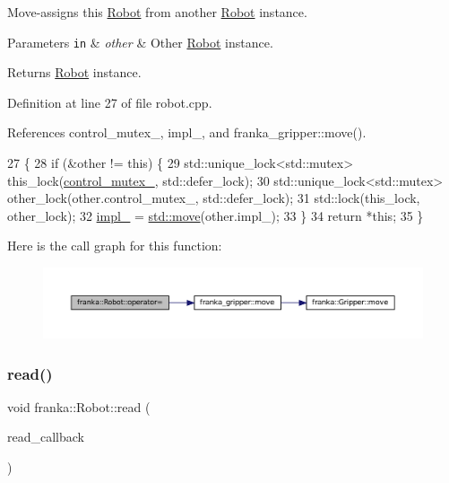 Move-\/assigns this \hyperlink{classfranka_1_1Robot}{Robot} from another \hyperlink{classfranka_1_1Robot}{Robot} instance.


\begin{DoxyParams}[1]{Parameters}
\mbox{\tt in}  & {\em other} & Other \hyperlink{classfranka_1_1Robot}{Robot} instance.\\
\hline
\end{DoxyParams}
\begin{DoxyReturn}{Returns}
\hyperlink{classfranka_1_1Robot}{Robot} instance. 
\end{DoxyReturn}


Definition at line 27 of file robot.\+cpp.



References control\+\_\+mutex\+\_\+, impl\+\_\+, and franka\+\_\+gripper\+::move().


\begin{DoxyCode}
27                                               \{
28   \textcolor{keywordflow}{if} (&other != \textcolor{keyword}{this}) \{
29     std::unique\_lock<std::mutex> this\_lock(\hyperlink{classfranka_1_1Robot_a719ad1fab76f8edfc9f6f761671c1375}{control\_mutex\_}, std::defer\_lock);
30     std::unique\_lock<std::mutex> other\_lock(other.control\_mutex\_, std::defer\_lock);
31     std::lock(this\_lock, other\_lock);
32     \hyperlink{classfranka_1_1Robot_aca155054184e5b6478942fd6a1b82ba4}{impl\_} = \hyperlink{namespacefranka__gripper_a1356a87108d2229401d3755bd3e53bdf}{std::move}(other.impl\_);
33   \}
34   \textcolor{keywordflow}{return} *\textcolor{keyword}{this};
35 \}
\end{DoxyCode}
Here is the call graph for this function\+:
\nopagebreak
\begin{figure}[H]
\begin{center}
\leavevmode
\includegraphics[width=350pt]{classfranka_1_1Robot_a2ea3ee0a2e18796972fd8d93822e7998_cgraph}
\end{center}
\end{figure}
\mbox{\label{classfranka_1_1Robot_a82f85eed20426901a7e77b66c041664b}} 
\subsubsection{\texorpdfstring{read()}{read()}}
{\footnotesize\ttfamily void franka\+::\+Robot\+::read (\begin{DoxyParamCaption}\item[{std\+::function$<$ \hyperlink{classbool}{bool}(const \hyperlink{structfranka_1_1RobotState}{Robot\+State} \&)$>$}]{read\+\_\+callback }\end{DoxyParamCaption})}


